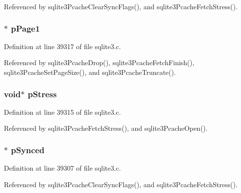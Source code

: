 Referenced by sqlite3\+Pcache\+Clear\+Sync\+Flags(), and sqlite3\+Pcache\+Fetch\+Stress().

\hypertarget{struct_p_cache_aa665d8dfa432d21bc7ea1cb02e66da76}{}
\subsubsection[{p\+Page1}]{$\ast$ p\+Page1}\label{struct_p_cache_aa665d8dfa432d21bc7ea1cb02e66da76}


Definition at line 39317 of file sqlite3.\+c.



Referenced by sqlite3\+Pcache\+Drop(), sqlite3\+Pcache\+Fetch\+Finish(), sqlite3\+Pcache\+Set\+Page\+Size(), and sqlite3\+Pcache\+Truncate().

\hypertarget{struct_p_cache_a1d4e21ef1bf03ea7a23a01f0a04b42e8}{}
\subsubsection[{p\+Stress}]{\setlength{\rightskip}{0pt plus 5cm}void$\ast$ p\+Stress}\label{struct_p_cache_a1d4e21ef1bf03ea7a23a01f0a04b42e8}


Definition at line 39315 of file sqlite3.\+c.



Referenced by sqlite3\+Pcache\+Fetch\+Stress(), and sqlite3\+Pcache\+Open().

\hypertarget{struct_p_cache_a58d723edf01b07ab861fe5c6dda1c8f2}{}
\subsubsection[{p\+Synced}]{$\ast$ p\+Synced}\label{struct_p_cache_a58d723edf01b07ab861fe5c6dda1c8f2}


Definition at line 39307 of file sqlite3.\+c.



Referenced by sqlite3\+Pcache\+Clear\+Sync\+Flags(), and sqlite3\+Pcache\+Fetch\+Stress().

\hypertarget{struct_p_cache_ac2525b85a8b6f4c5396ebe335e544cde}{}

